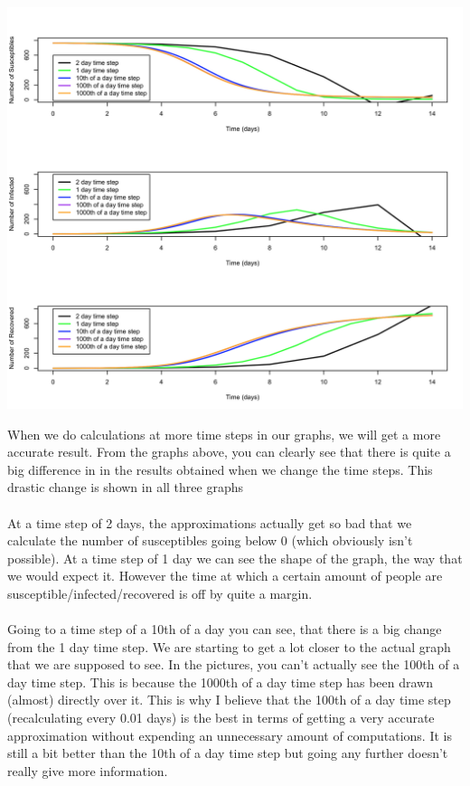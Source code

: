 \documentclass{article}
\begin{document}
        \includegraphics[width=\textwidth,height=\textheight,keepaspectratio]{time_interval_comparison.png}

        When we do calculations at more time steps in our graphs, we will get a more accurate result. From the graphs above, you can clearly see that there is quite a big difference in in the results obtained when we change the time steps. This drastic change is shown in all three graphs 
        \\
        \\
        At a time step of 2 days, the approximations actually get so bad that we calculate the number of susceptibles going below 0 (which obviously isn't possible). At a time step of 1 day we can see the shape of the graph, the way that we would expect it. However the time at which a certain amount of people are susceptible/infected/recovered is off by quite a margin.
        \\
        \\
        Going to a time step of a 10th of a day you can see, that there is a big change from the 1 day time step. We are starting to get a lot closer to the actual graph that we are supposed to see. In the pictures, you can't actually see the 100th of a day time step. This is because the 1000th of a day time step has been drawn (almost) directly over it. This is why I believe that the 100th of a day time step (recalculating every 0.01 days) is the best in terms of getting a very accurate approximation without expending an unnecessary amount of computations. It is still a bit better than the 10th of a day time step but going any further doesn't really give more information.
\end{document}
